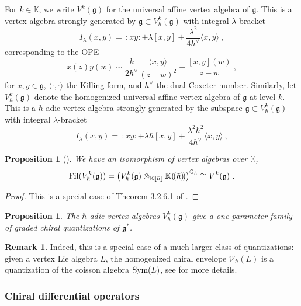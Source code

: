 \documentclass[11pt]{amsart}
\numberwithin{equation}{section}
\newtheorem{prop}[theo]{Proposition}
\theoremstyle{definition}
\newtheorem{rmk}[theo]{Remark}
\newcommand{\bb}{\mathbb}
\newcommand{\mc}{\mathcal}
\newcommand{\fph}{{[\![\hbar]\!]}}
\newcommand{\ik}{{\bb K}}
\newcommand{\0}{{\textbf{0}}}
\newcommand{\Sym}{\textup{Sym}}
\def\IG{\mathbb{G}}
\def\VV{{\mc V}}
\def\gf{\mathfrak{g}}
\begin{document}
For $k\in \ik$, we write $V^k(\gf)$ for the universal affine vertex algebra of $\gf$. This is a vertex algebra strongly generated by $\gf\subset V^k_\hbar(\gf)$ with integral $\lambda$-bracket
\[
I_\lambda(x,y) =\,  :xy: +\lambda  [x,y] + \frac{\lambda^2}{4 h^\vee} \langle x,y\rangle~,
\]
corresponding to the OPE
\[
x(z)y(w) \sim \frac{k}{2h^\vee}\frac{ \langle x, y\rangle}{(z-w)^2} + \frac{[x,y](w)}{z-w}~,
\]
for $x,y\in \gf$, $\langle \cdot,\cdot\rangle$ the Killing form, and $h^\vee$ the dual Coxeter number. Similarly, let $V^k_\hbar(\gf)$ denote the homogenized universal affine vertex algebra of $\gf$ at level $k$. This is a $\hbar$-adic vertex algebra strongly generated by the subspace $\gf\subset V^k_\hbar(\gf)$ with integral $\lambda$-bracket
\[
I_\lambda(x,y) =\,  :xy: +\lambda \hbar [x,y] + \frac{\lambda^2\hbar^2}{4 h^\vee} \langle x,y\rangle~,
\]

\begin{prop}[\cite{Arakawa2015:local}]
	We have an isomorphism of vertex algebras over $\ik$,
	\[
	{\rm Fil}(V^k_{\hbar}(\gf)) = \big(V^k_\hbar(\gf)\otimes_{\ik\fph}\ik(\!(\hbar)\!)\big)^{\IG_\hbar} \cong V^k(\gf)~.
	\]
\end{prop}
\begin{proof}
	This is a special case of Theorem 3.2.6.1 of \cite{Arakawa2015:local}.
\end{proof}




\begin{prop}
 The $\hbar$-adic vertex algebras $V_\hbar^k(\gf)$ give a one-parameter family of graded chiral quantizations of $\gf^*$.
\end{prop}


\begin{rmk}
	Indeed, this is a special case of a much larger class of quantizations: given a vertex Lie algebra $L$, the homogenized chiral envelope $\VV_\hbar(L)$ is a quantization of the coisson algebra $\Sym(L)$, see \cite{Li04,Castellan:2023jnu} for more details.
\end{rmk}


\subsubsection{Chiral differential operators}\label{sssec:cdos intro}
\end{document}
